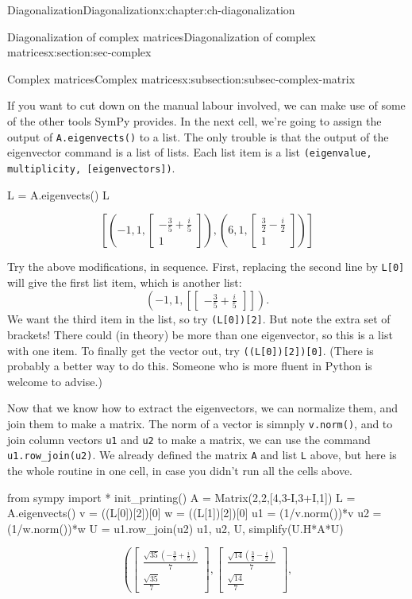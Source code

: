 \documentclass[oneside,10pt,]{book}
\newcommand{\mono}[1]{\texttt{#1}}
\numberwithin{equation}{section}
\newcommand{\bbm}{\begin{bmatrix}}
\newcommand{\ebm}{\end{bmatrix}}
\begin{document}
\begin{chapterptx}{Diagonalization}{}{Diagonalization}{}{}{x:chapter:ch-diagonalization}
\begin{sectionptx}{Diagonalization of complex matrices}{}{Diagonalization of complex matrices}{}{}{x:section:sec-complex}
\begin{subsectionptx}{Complex matrices}{}{Complex matrices}{}{}{x:subsection:subsec-complex-matrix}
\par
If you want to cut down on the manual labour involved, we can make use of some of the other tools SymPy provides. In the next cell, we're going to assign the output of \mono{A.eigenvects()} to a list. The only trouble is that the output of the eigenvector command is a list of lists. Each list item is a list \mono{(eigenvalue, multiplicity, [eigenvectors])}.%
\begin{sageinput}
L = A.eigenvects()
L
\end{sageinput}
\begin{sageoutput}
\[\left[\left(-1,1,\bbm -\frac35+\frac{i}{5}\\1\ebm\right), \left(6,1,\bbm \frac32-\frac{i}{2}\\1\ebm\right)\right]\]
\end{sageoutput}
Try the above modifications, in sequence. First, replacing the second line by \mono{L[0]} will give the first list item, which is another list:%
\begin{equation*}
\left(-1,1,\left[\bbm -\frac35+\frac{i}{5}\ebm\right]\right)\text{.}
\end{equation*}
We want the third item in the list, so try \mono{(L[0])[2]}. But note the extra set of brackets! There could (in theory) be more than one eigenvector, so this is a list with one item. To finally get the vector out, try \mono{((L[0])[2])[0]}. (There is probably a better way to do this. Someone who is more fluent in Python is welcome to advise.)%
\par
Now that we know how to extract the eigenvectors, we can normalize them, and join them to make a matrix. The norm of a vector is simnply \mono{v.norm()}, and to join column vectors \mono{u1} and \mono{u2} to make a matrix, we can use the command \mono{u1.row\_join(u2)}. We already defined the matrix \mono{A} and list \mono{L} above, but here is the whole routine in one cell, in case you didn't run all the cells above.%
\begin{sageinput}
from sympy import *
init_printing()
A = Matrix(2,2,[4,3-I,3+I,1])
L = A.eigenvects()
v = ((L[0])[2])[0]
w = ((L[1])[2])[0]
u1 = (1/v.norm())*v
u2 = (1/w.norm())*w
U = u1.row_join(u2)
u1, u2, U, simplify(U.H*A*U)
\end{sageinput}
\begin{sageoutput}
\[\left(\bbm\frac{\sqrt{35}(-\frac35+\frac{i}{5})}{7}\\ \frac{\sqrt{35}}{7}\ebm,\bbm \frac{\sqrt{14}(\frac32-\frac{i}{2})}{7}\\ \frac{\sqrt{14}}{7}\ebm,
\]
\end{sageoutput}
\end{subsectionptx}
\end{sectionptx}
\end{chapterptx}
\end{document}
